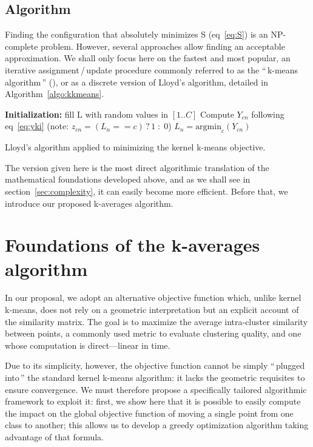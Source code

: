 \documentclass[10pt,journal,compsoc]{IEEEtran}
\newcommand{\cad}{---} %
\newcommand{\gl}[1]{``\,#1\,''} %
\begin{document}
\subsection{Algorithm}

Finding the configuration that absolutely minimizes S (eq~\ref{eq:S}) is an NP-complete problem. However, several approaches allow finding an acceptable approximation. We shall only focus here on the fastest and most popular, an iterative assignment\,/\,update procedure commonly referred to as the \gl{k-means algorithm} (\cite{macQueenBsmsp67}), or as a discrete version of Lloyd's algorithm, detailed in Algorithm~\ref{algo:kkmeans}.

\begin{algorithm}
	\label{algo:kkmeans}
	\SetAlgoLined
	\BlankLine	
	\textbf{Initialization:} fill L with random values in $[1..C]$\;
	\BlankLine	
	 {
		 {
			 {
				Compute $Y_{cn}$ following eq~\ref{eq:yki} \label{algline:kkmeans_cplx1}
				(note: $z_{cn} = (L_n == c)\,?\,1\;:\;0$)
			}
			$L_n = \textrm{argmin}_c (Y_{cn})$\;
		}
	}
	\BlankLine
	\caption{Lloyd's algorithm applied to minimizing the kernel k-means objective.}
\end{algorithm}

The version given here is the most direct algorithmic translation of the mathematical foundations developed above, and as we shall see in section~\ref{sec:complexity}, it can easily become more efficient. Before that, we introduce our proposed k-averages algorithm.


\section{Foundations of the k-averages algorithm} \label{sec:kaverages}

In our proposal, we adopt an alternative objective function which, unlike kernel k-means, does not rely on a geometric interpretation but an explicit account of the similarity matrix. The goal is to maximize the average intra-cluster similarity between points, a commonly used metric to evaluate clustering quality, and one whose computation is direct\cad{}linear in time.

Due to its simplicity, however, the objective function cannot be simply \gl{plugged into} the standard kernel k-means algorithm: it lacks the geometric requisites to ensure convergence. We must therefore propose a specifically tailored algorithmic framework to exploit it: first, we show here that it is possible to easily compute the impact on the global objective function of moving a single point from one class to another; this allows us to develop a greedy optimization algorithm taking advantage of that formula.
\end{document}
